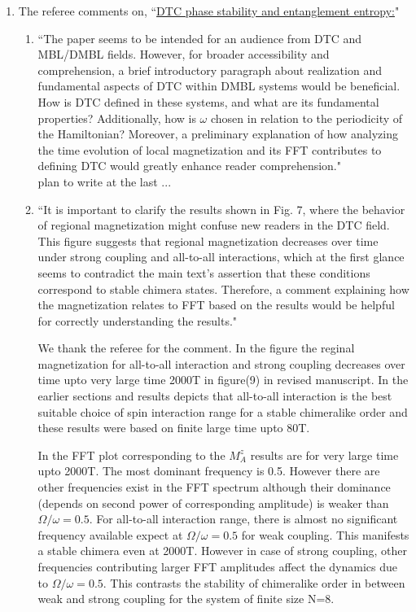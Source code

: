 \documentclass[aps,prb,reprint,showpacs,floatfix,superscriptaddress, onecolumn, nofootinbib, 10pt]{revtex4-2}
\newcommand{\response}[1]{{\color{black}#1}} %
\newcommand{\comment}[1]{{\color{blue}#1}} %
\begin{document}
\begin{enumerate}
\begin{enumerate}
		\item The referee comments on, \comment{``\underline{DTC phase stability and entanglement entropy:}"}
		\begin{enumerate}
			\item \comment{``The paper seems to be intended for an audience from DTC and MBL/DMBL fields. However, for broader accessibility and comprehension, a brief introductory paragraph about realization and fundamental aspects of DTC within DMBL
			systems would be beneficial. How is DTC defined in these systems, and what are its fundamental properties? Additionally, how is $\omega$ chosen in relation to the periodicity of the Hamiltonian? Moreover, a preliminary explanation of how analyzing the time evolution of local magnetization and its FFT contributes to defining DTC would greatly enhance reader comprehension."}\\
		
			\response{ plan to write at the last ... 
			}
			\item \comment{``It is important to clarify the results shown in Fig. 7, where the behavior of regional magnetization might confuse new readers in the DTC field. This figure suggests that regional magnetization decreases over time under strong coupling and all-to-all interactions, which at the first glance seems to contradict the main text’s assertion that these conditions correspond to stable chimera states. Therefore, a comment  explaining how the magnetization relates to FFT based on the results would be helpful for correctly understanding the results."}\\
			
			\response{
			We thank the referee for the comment. In the figure the reginal magnetization for all-to-all interaction and strong coupling  decreases over time upto very large time 2000T in figure(9) in revised manuscript. In the earlier sections and results depicts that all-to-all interaction is the best suitable choice of spin interaction range for a stable chimeralike order and these results were based on finite large time upto 80T.
			
			In the FFT plot corresponding to the $M^z_A$ results are for very large time upto 2000T. The most dominant frequency is 0.5. However there are other frequencies exist in the FFT spectrum although their dominance (depends on second power of corresponding amplitude) is weaker than $\Omega/\omega=0.5$. For all-to-all interaction range, there is almost no significant frequency available expect at $\Omega/\omega=0.5$ for weak coupling. This manifests a stable chimera even at 2000T. However in case of strong coupling, other frequencies contributing larger FFT amplitudes affect the dynamics due to  $\Omega/\omega=0.5$. This contrasts the stability of chimeralike order in between  weak and strong coupling for the system of finite size N=8.
			
}
\end{enumerate}
\end{enumerate}
\end{enumerate}
\end{document}

